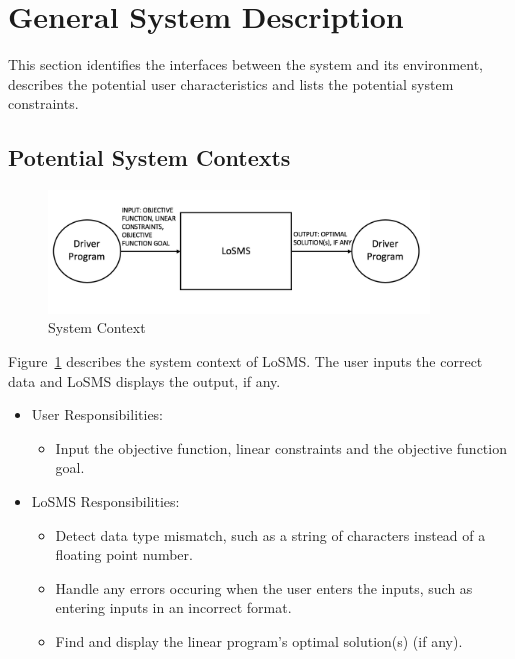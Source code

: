 \documentclass[12pt]{article}
\newcommand{\famname}{LoSMS} %
\begin{document}
\section{General System Description} \label{SecSystemDescription}

This section identifies the interfaces between the system and its environment,
describes the potential user characteristics and lists the potential system
constraints.

\subsection{Potential System Contexts}

\begin{figure}[h!]
	\begin{center}
		\includegraphics[width=0.9\textwidth, 
		height=0.20\textheight]{system-context}
		\caption{System Context}
		\label{Figure_SystemContext} 
	\end{center}
\end{figure}

Figure~\ref{Figure_SystemContext} describes the system context of \famname{}. 
The user inputs the correct data and \famname{} displays the output, if any.

\begin{itemize}
	\item User Responsibilities:
	\begin{itemize}
		\item Input the objective function, linear constraints and the 
		objective function goal.
	\end{itemize}
	\item \famname{} Responsibilities:
	\begin{itemize}
		\item Detect data type mismatch, such as a string of characters instead 
		of a floating point number.
		
		\item Handle any errors occuring when the user enters the inputs, such 
		as entering inputs in an incorrect format.
		
		\item Find and display the linear program's optimal solution(s) (if 
		any).
	\end{itemize}
\end{itemize}
\end{document}
